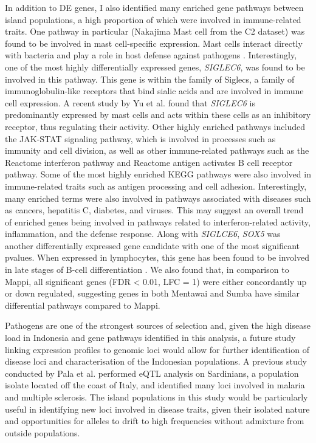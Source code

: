 \documentclass[12pt,a4paper,titlepage,twoside,openright]{book}
\begin{document}
\begin{mainmatter}
{In addition to DE genes, I also identified many enriched gene pathways between island populations, a high proportion of which were involved in immune-related traits. One pathway in particular (Nakajima Mast cell from the C2 dataset) was found to be involved in mast cell-specific expression. Mast cells interact directly with bacteria and play a role in host defense against pathogens \cite{amin2012role}. Interestingly, one of the most highly differentially expressed genes, \textit{SIGLEC6}, was found to be involved in this pathway. This gene is within the family of Siglecs, a family of immunoglobulin-like receptors that bind sialic acids and are involved in immune cell expression. A recent study by Yu et al. \cite{yu2018functional} found that \textit{SIGLEC6} is predominantly expressed by mast cells and acts within these cells as an inhibitory receptor, thus regulating their activity. Other highly enriched pathways included the JAK-STAT signaling pathway, which is involved in processes such as immunity and cell division, as well as other immune-related pathways such as the Reactome interferon pathway and Reactome antigen activates B cell receptor pathway. Some of the most highly enriched KEGG pathways were also involved in immune-related traits such as antigen processing and cell adhesion. Interestingly, many enriched terms were also involved in pathways associated with diseases such as cancers, hepatitis C, diabetes, and viruses. This may suggest an overall trend of enriched genes being involved in pathways related to interferon-related activity, inflammation, and the defense response. Along with \textit{SIGLCE6}, \textit{SOX5} was another differentially expressed gene candidate with one of the most significant pvalues. When expressed in lymphocytes, this gene has been found to be involved in late stages of B-cell differentiation \cite{rakhmanov2014high}. We also found that, in comparison to Mappi, all significant genes (FDR < 0.01, LFC = 1) were either concordantly up or down regulated, suggesting genes in both Mentawai and Sumba have similar differential pathways compared to Mappi. 

Pathogens are one of the strongest sources of selection and, given the high disease load in Indonesia and gene pathways identified in this analysis, a future study linking expression profiles to genomic loci would allow for further identification of disease loci and characterisation of the Indonesian populations. A previous study conducted by Pala et al. \cite{pala2017population} performed eQTL analysis on Sardinians, a population isolate located off the coast of Italy, and identified many loci involved in malaria and multiple sclerosis. The island populations in this study would be particularly useful in identifying new loci involved in disease traits, given their isolated nature and opportunities for alleles to drift to high frequencies without admixture from outside populations. 

}
\end{mainmatter}
\end{document}
